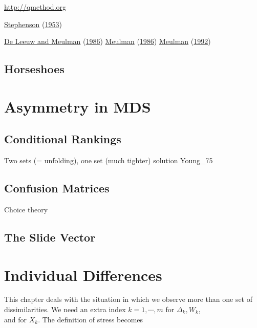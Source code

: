 \documentclass[
  12pt,
]{book}
\theoremstyle{definition}
\theoremstyle{definition}
\theoremstyle{definition}
\theoremstyle{definition}
\theoremstyle{remark}
\begin{document}
\url{http://qmethod.org}

\protect\hyperlink{ref-stephenson_53}{Stephenson} (\protect\hyperlink{ref-stephenson_53}{1953})

\protect\hyperlink{ref-deleeuw_meulman_C_86}{De Leeuw and Meulman} (\protect\hyperlink{ref-deleeuw_meulman_C_86}{1986})
\protect\hyperlink{ref-meulman_86}{Meulman} (\protect\hyperlink{ref-meulman_86}{1986})
\protect\hyperlink{ref-meulman_92}{Meulman} (\protect\hyperlink{ref-meulman_92}{1992})

\hypertarget{conshorseshoes}{%
\section{Horseshoes}\label{conshorseshoes}}

\hypertarget{asymmds}{%
\chapter{Asymmetry in MDS}\label{asymmds}}

\hypertarget{conditional-rankings}{%
\section{Conditional Rankings}\label{conditional-rankings}}

Two sets (= unfolding), one set (much tighter) solution
Young\_75

\hypertarget{confusion-matrices}{%
\section{Confusion Matrices}\label{confusion-matrices}}

Choice theory

\hypertarget{the-slide-vector}{%
\section{The Slide Vector}\label{the-slide-vector}}

\hypertarget{chindif}{%
\chapter{Individual Differences}\label{chindif}}

This chapter deals with the situation in which we observe more than one set of
dissimilarities. We need an extra index \(k=1,\cdots,m\) for \(\Delta_k, W_k\),\\
and for \(X_k\). The definition of stress becomes
\end{document}
